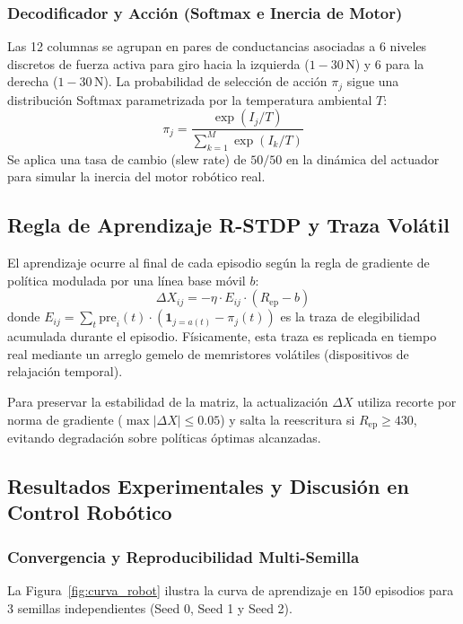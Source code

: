 \subsubsection{Decodificador y Acción (Softmax e Inercia de Motor)}
Las 12 columnas se agrupan en pares de conductancias asociadas a 6 niveles discretos de fuerza activa para giro hacia la izquierda ($1 - 30\,\text{N}$) y 6 para la derecha ($1 - 30\,\text{N}$). La probabilidad de selección de acción $\pi_j$ sigue una distribución Softmax parametrizada por la temperatura ambiental $T$:
\begin{equation}
    \pi_j = \frac{\exp(I_j / T)}{\sum_{k=1}^M \exp(I_k / T)}
\end{equation}
Se aplica una tasa de cambio (slew rate) de $50/50$ en la dinámica del actuador para simular la inercia del motor robótico real.

\subsection{Regla de Aprendizaje R-STDP y Traza Volátil}
El aprendizaje ocurre al final de cada episodio según la regla de gradiente de política modulada por una línea base móvil $b$:
\begin{equation}
    \Delta X_{ij} = -\eta \cdot E_{ij} \cdot (R_{\text{ep}} - b)
\end{equation}
donde $E_{ij} = \sum_{t} \text{pre}_i(t) \cdot (\mathbf{1}_{j = a(t)} - \pi_j(t))$ es la traza de elegibilidad acumulada durante el episodio. Físicamente, esta traza es replicada en tiempo real mediante un arreglo gemelo de memristores volátiles (dispositivos de relajación temporal).

Para preservar la estabilidad de la matriz, la actualización $\Delta X$ utiliza recorte por norma de gradiente ($\max|\Delta X| \le 0.05$) y salta la reescritura si $R_{\text{ep}} \ge 430$, evitando degradación sobre políticas óptimas alcanzadas.

\subsection{Resultados Experimentales y Discusión en Control Robótico}

\subsubsection{Convergencia y Reproducibilidad Multi-Semilla}
La Figura~\ref{fig:curva_robot} ilustra la curva de aprendizaje en 150 episodios para 3 semillas independientes (Seed 0, Seed 1 y Seed 2).

